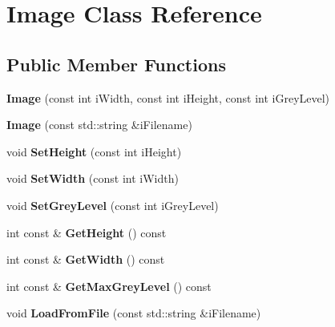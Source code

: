 \hypertarget{classImage}{\section{Image Class Reference}
\label{classImage}
}
\subsection*{Public Member Functions}
\begin{DoxyCompactItemize}
\item 
\hypertarget{classImage_a0f45033c76471420cb42775c91290eb8}{{\bfseries Image} (const int i\-Width, const int i\-Height, const int i\-Grey\-Level)}\label{classImage_a0f45033c76471420cb42775c91290eb8}

\item 
\hypertarget{classImage_ac2b9ea78dbf56127b04e6c2a3fdbec5f}{{\bfseries Image} (const std\-::string \&i\-Filename)}\label{classImage_ac2b9ea78dbf56127b04e6c2a3fdbec5f}

\item 
\hypertarget{classImage_a74f502d0c938bf043b91b8a4e6841a4e}{void {\bfseries Set\-Height} (const int i\-Height)}\label{classImage_a74f502d0c938bf043b91b8a4e6841a4e}

\item 
\hypertarget{classImage_ae6db09b55cca7e411ce6f474dce2b068}{void {\bfseries Set\-Width} (const int i\-Width)}\label{classImage_ae6db09b55cca7e411ce6f474dce2b068}

\item 
\hypertarget{classImage_af18b61d109c00cb7b5fc300ce5687547}{void {\bfseries Set\-Grey\-Level} (const int i\-Grey\-Level)}\label{classImage_af18b61d109c00cb7b5fc300ce5687547}

\item 
\hypertarget{classImage_a9157cb283f6b863c47f437d84dde75b3}{int const \& {\bfseries Get\-Height} () const }\label{classImage_a9157cb283f6b863c47f437d84dde75b3}

\item 
\hypertarget{classImage_a43bbe5663dc2a2550f28051aec632ec8}{int const \& {\bfseries Get\-Width} () const }\label{classImage_a43bbe5663dc2a2550f28051aec632ec8}

\item 
\hypertarget{classImage_ae2730b30cd0edc6cb90646795d3f5ff6}{int const \& {\bfseries Get\-Max\-Grey\-Level} () const }\label{classImage_ae2730b30cd0edc6cb90646795d3f5ff6}

\item 
\hypertarget{classImage_a12c9a42ef545c51051b948400005e474}{void {\bfseries Load\-From\-File} (const std\-::string \&i\-Filename)}\label{classImage_a12c9a42ef545c51051b948400005e474}


\end{DoxyCompactItemize}
